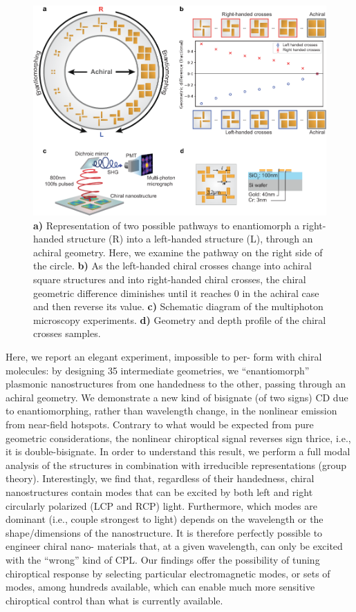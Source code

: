 \begin{figure}[htb!]	
    \centering	
    \includegraphics[scale=0.8]{./figures/results/EnantiomorphingChiralCrosses/setup.pdf}
    \caption{\label{fig:results:EnantiomorphingChiralCrosses:setup}
    \textbf{a)} Representation of two possible pathways to enantiomorph a right-handed structure (R) into a left-handed structure (L), through an achiral geometry. Here, we examine the pathway on the right side of the circle. \textbf{b)} As the left-handed chiral crosses change into achiral square structures and into right-handed chiral crosses, the chiral geometric difference diminishes until it reaches 0 in the achiral case and then reverse its value. \textbf{c)} Schematic diagram of the multiphoton microscopy experiments. \textbf{d)} Geometry and depth profile of the chiral crosses samples.}	
\end{figure}

Here, we report an elegant experiment, impossible to per-
form with chiral molecules: by designing 35 intermediate geometries, we ``enantiomorph'' plasmonic nanostructures from one handedness to the other, passing through an achiral geometry. 
We demonstrate a new kind of bisignate (of two signs) CD due to enantiomorphing, rather than wavelength change, in the nonlinear emission from near-field hotspots. Contrary to what would be expected from pure geometric considerations, the nonlinear chiroptical signal reverses sign thrice, i.e., it is double-bisignate. In order to understand this result, we perform a full modal analysis of the structures in combination with irreducible representations (group theory). 
Interestingly, we find that, regardless of their handedness, chiral nanostructures contain modes that can be excited by both left and right circularly polarized (LCP and RCP) light. Furthermore, which modes are dominant (i.e., couple strongest to light) depends on the wavelength or the shape/dimensions of the nanostructure. It is therefore perfectly possible to engineer chiral nano- materials that, at a given wavelength, can only be excited with the “wrong” kind of CPL. 
Our findings offer the possibility of tuning chiroptical response by selecting particular electromagnetic modes, or sets of modes, among hundreds available, which can enable much more sensitive chiroptical control than what is currently available.

